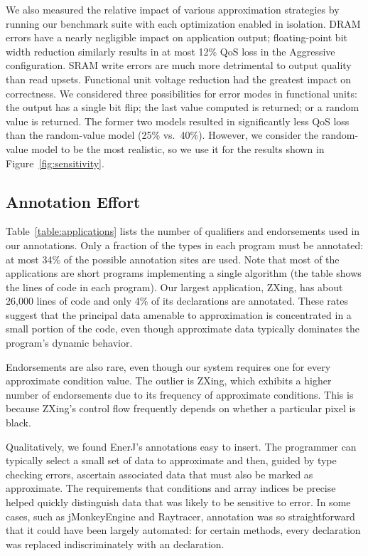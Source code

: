 We also measured the relative impact of various approximation
strategies by running our benchmark suite with each optimization enabled in
isolation. DRAM errors have a nearly negligible impact on application output;
floating-point bit width reduction similarly results in at most 12\% QoS loss
in the Aggressive configuration. SRAM write errors are much more detrimental to
output quality than read upsets. Functional unit voltage reduction had the
greatest impact on correctness. We considered three possibilities for error
modes in
functional units: the output has a single bit flip; the last value computed is
returned; or a random value is returned. The former two models resulted in
significantly less QoS loss than the random-value model (25\% vs.~40\%).
However, we consider the random-value model to be the most realistic, so we use it for
the results shown in Figure~\ref{fig:sensitivity}.

\subsection{Annotation Effort}
\label{effort}
Table~\ref{table:applications} lists the number of qualifiers and
endorsements used in our annotations.
Only a fraction of the types in each program must be annotated: at most 34\% of
the possible annotation sites are used.
Note that most of the applications are short programs implementing a
single algorithm (the table shows the lines of code in
each program). Our largest application, ZXing, has about 26,000 lines
of code and only 4\% of its declarations are annotated.
These rates suggest that the principal data
amenable to approximation is concentrated in a small portion of the code,
even though approximate data typically dominates the program's dynamic behavior.

Endorsements are also rare, even though our system requires one for every
approximate condition value. The outlier is ZXing, which exhibits a higher
number of endorsements due to its frequency of approximate conditions. This is
because ZXing's control flow
frequently depends on whether a particular pixel is black.

Qualitatively, we found EnerJ's annotations easy to insert. The programmer
can typically select a small set of data to approximate and then, guided by type
checking errors, ascertain associated data that must also be marked as
approximate. The requirements that conditions and array indices be precise
helped quickly distinguish data that was likely to be sensitive to error. In
some cases, such as jMonkeyEngine and Raytracer, annotation was so
straightforward that it could have been largely automated: for certain methods,
every  declaration was replaced indiscriminately with an
 declaration.

